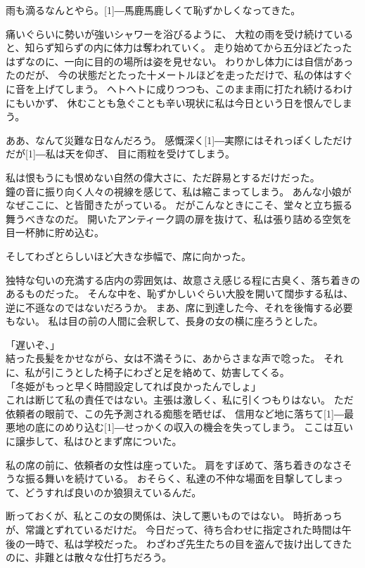 \documentclass[../HiganMain]{subfiles}
\begin{document}
雨も滴るなんとやら。\scalebox{3}[1]{―}馬鹿馬鹿しくて恥ずかしくなってきた。

痛いぐらいに勢いが強いシャワーを浴びるように、
大粒の雨を受け続けていると、知らず知らずの内に体力は奪われていく。
走り始めてから五分ほどたったはずなのに、一向に目的の場所は姿を見せない。
わりかし体力には自信があったのだが、
今の状態だとたった十メートルほどを走っただけで、私の体はすぐに音を上げてしまう。
ヘトヘトに成りつつも、このまま雨に打たれ続けるわけにもいかず、
休むことも急ぐことも辛い現状に私は今日という日を恨んでしまう。

ああ、なんて災難な日なんだろう。
感慨深く\scalebox{3}[1]{―}実際にはそれっぽくしただけだが\scalebox{3}[1]{―}私は天を仰ぎ、
目に雨粒を受けてしまう。

私は恨もうにも恨めない自然の偉大さに、ただ辟易とするだけだった。\\

鐘の音に振り向く人々の視線を感じて、私は縮こまってしまう。
あんな小娘がなぜここに、と皆聞きたがっている。
だがこんなときにこそ、堂々と立ち振る舞うべきなのだ。
開いたアンティーク調の扉を抜けて、私は張り詰める空気を目一杯肺に貯め込む。

そしてわざとらしいほど大きな歩幅で、席に向かった。

独特な匂いの充満する店内の雰囲気は、故意さえ感じる程に古臭く、落ち着きのあるものだった。
そんな中を、恥ずかしいぐらい大股を開いて闊歩する私は、逆に不遜なのではないだろうか。
まあ、席に到達した今、それを後悔する必要もない。
私は目の前の人間に会釈して、長身の女の横に座ろうとした。

「遅いぞ、」\\
結った長髪をかせながら、女は不満そうに、あからさまな声で唸った。
それに、私が引こうとした椅子にわざと足を絡めて、妨害してくる。\\
「冬姫がもっと早く時間設定してれば良かったんでしょ」\\
これは断じて私の責任ではない。主張は激しく、私に引くつもりはない。
ただ依頼者の眼前で、この先予測される痴態を晒せば、
信用など地に落ちて\scalebox{3}[1]{―}最悪地の底にのめり込む\scalebox{3}[1]{―}せっかくの収入の機会を失ってしまう。
ここは互いに譲歩して、私はひとまず席についた。

私の席の前に、依頼者の女性は座っていた。
肩をすぼめて、落ち着きのなさそうな振る舞いを続けている。
おそらく、私達の不仲な場面を目撃してしまって、どうすれば良いのか狼狽えているんだ。

断っておくが、私とこの女の関係は、決して悪いものではない。
時折あっちが、常識とずれているだけだ。
今日だって、待ち合わせに指定された時間は午後の一時で、私は学校だった。
わざわざ先生たちの目を盗んで抜け出してきたのに、非難とは散々な仕打ちだろう。
\end{document}
